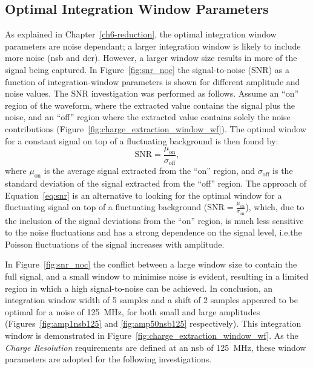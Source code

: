 \subsection{Optimal Integration Window Parameters}

As explained in Chapter~\ref{ch6-reduction}, the optimal integration window parameters are noise dependant; a larger integration window is likely to include more noise (\gls{nsb} and \gls{dcr}). However, a larger window size results in more of the signal being captured. In Figure~\ref{fig:snr_noc} the signal-to-noise ($\text{SNR}$) as a function of integration-window parameters is shown for different amplitude and noise values. The $\text{SNR}$ investigation was performed as follows. Assume an ``on'' region of the waveform, where the extracted value contains the signal plus the noise, and an ``off'' region where the extracted value contains solely the noise contributions (Figure~\ref{fig:charge_extraction_window_wf}). The optimal window for a constant signal on top of a fluctuating background is then found by:
\begin{equation} \label{eq:snr}
\text{SNR} = \frac{\mu_\text{on}}{\sigma_\text{off}},
\end{equation}
where $\mu_\text{on}$ is the average signal extracted from the ``on'' region, and $\sigma_\text{off}$ is the standard deviation of the signal extracted from the ``off'' region. The approach of Equation~\ref{eq:snr} is an alternative to looking for the optimal window for a fluctuating signal on top of a fluctuating background ($\text{SNR} = \frac{\mu_\text{on}}{\sigma_\text{on}}$), which, due to the inclusion of the signal deviations from the ``on'' region, is much less sensitive to the noise fluctuations and has a strong dependence on the signal level, i.e.\@ the Poisson fluctuations of the signal increases with amplitude.

In Figure~\ref{fig:snr_noc} the conflict between a large window size to contain the full signal, and a small window to minimise noise is evident, resulting in a limited region in which a high signal-to-noise can be achieved. In conclusion, an integration window width of 5 samples and a shift of 2 samples appeared to be optimal for a noise of \SI{125}{MHz}, for both small and large amplitudes (Figures~\ref{fig:amp1nsb125} and \ref{fig:amp50nsb125} respectively). This integration window is demonstrated in Figure~\ref{fig:charge_extraction_window_wf}. As the \textit{Charge Resolution} requirements are defined at an \gls{nsb} of \SI{125}{MHz}, these window parameters are adopted for the following investigations.


